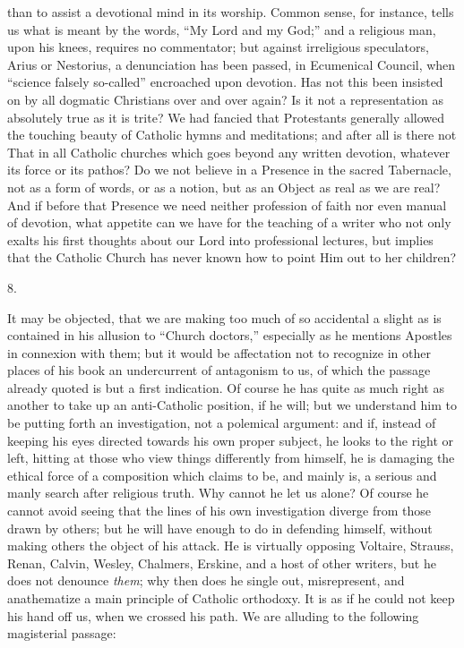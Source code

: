 than to assist a devotional mind in its worship. Common sense, for
instance, tells us what is meant by the words, ``My Lord and my God;''
and a religious man, upon his knees, requires no commentator; but
against irreligious speculators, Arius or Nestorius, a denunciation
has been passed, in Ecumenical Council, when ``science falsely
so-called'' encroached upon devotion. Has not this been insisted on by
all dogmatic Christians over and over again? Is it not a
representation as absolutely true as it is trite? We had fancied that
Protestants generally allowed the touching beauty of Catholic hymns
and meditations; and after all is there not That in all Catholic
churches which goes beyond any written devotion, whatever its force or
its pathos? Do we not believe in a Presence in the sacred Tabernacle,
not as a form of words, or as a notion, but as an Object as real as we
are real? And if before that Presence we need neither profession of
faith nor even manual of devotion, what appetite can we have for
the teaching of a writer who not only exalts his first thoughts about
our Lord into professional lectures, but implies that the Catholic
Church has never known how to point Him out to her children?

8.

It may be objected, that we are making too much
of so accidental a slight as is contained in his allusion to ``Church
doctors,'' especially as he mentions Apostles in connexion with them;
but it would be affectation not to recognize in other places of his
book an undercurrent of antagonism to us, of which the passage already
quoted is but a first indication. Of course he has quite as much right
as another to take up an anti-Catholic position, if he will; but we
understand him to be putting forth an investigation, not a polemical
argument: and if, instead of keeping his eyes directed towards his own
proper subject, he looks to the right or left, hitting at those who
view things differently from himself, he is damaging the ethical force
of a composition which claims to be, and mainly is, a serious and
manly search after religious truth. Why cannot he let us alone? Of
course he cannot avoid seeing that the lines of his own investigation
diverge from those drawn by others; but he will have enough to do in
defending himself, without making others the object of his attack. He
is virtually opposing Voltaire, Strauss, Renan, Calvin, Wesley,
Chalmers, Erskine, and a host of other writers, but he does not
denounce \emph{them}; why then does he single out, misrepresent, and
anathematize a main principle of Catholic orthodoxy. It is as if he
could not keep his hand off us, when we crossed his path. We are
alluding to the following magisterial passage:

